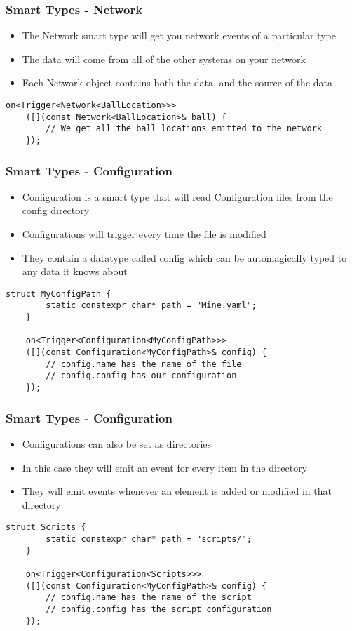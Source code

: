 \documentclass{beamer}
\begin{document}
\begin{frame}[fragile]
	\frametitle{Smart Types - Network}
	\begin{itemize}
		\item The Network smart type will get you network events of a particular type
		\item The data will come from all of the other systems on your network
		\item Each Network object contains both the data, and the source of the data
	\end{itemize}

	\begin{lstlisting}[language=nuclear]
	on<Trigger<Network<BallLocation>>>
	([](const Network<BallLocation>& ball) {
	    // We get all the ball locations emitted to the network
	});
	\end{lstlisting}
\end{frame}

\begin{frame}[fragile]
	\frametitle{Smart Types - Configuration}
	\begin{itemize}
		\item Configuration is a smart type that will read Configuration files from the config directory
		\item Configurations will trigger every time the file is modified
		\item They contain a datatype called config which can be automagically typed to any data it knows about
	\end{itemize}

	\begin{lstlisting}[language=nuclear]
	struct MyConfigPath {
	    static constexpr char* path = "Mine.yaml";
	}

	on<Trigger<Configuration<MyConfigPath>>>
	([](const Configuration<MyConfigPath>& config) {
	    // config.name has the name of the file
	    // config.config has our configuration
	});
	\end{lstlisting}
\end{frame}

\begin{frame}[fragile]
	\frametitle{Smart Types - Configuration}

	\begin{itemize}
		\item Configurations can also be set as directories
		\item In this case they will emit an event for every item in the directory
		\item They will emit events whenever an element is added or modified in that directory
	\end{itemize}

	\begin{lstlisting}[language=nuclear]
	struct Scripts {
	    static constexpr char* path = "scripts/";
	}

	on<Trigger<Configuration<Scripts>>>
	([](const Configuration<MyConfigPath>& config) {
	    // config.name has the name of the script
	    // config.config has the script configuration
	});
	\end{lstlisting}
\end{frame}
\end{document}
